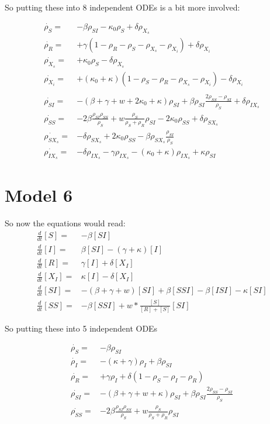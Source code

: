 \documentclass[a4paper,10pt]{article}
\begin{document}
 So putting these into 8 independent ODEs is a bit more involved:
 
 \begin{align}
  \dot{\rho_S}=&-\beta \rho_{SI}-\kappa_0\rho_S+ \delta \rho_{X_s}\\
  \dot{\rho_{R}}=&+
  \gamma(1-\rho_{R}-\rho_{S}-\rho_{X_s}-\rho_{X_i}) +\delta \rho_{X_i}\\
  \dot {\rho_{X_s}}=&+
  \kappa_0\rho_S - \delta \rho_{X_s}\\
  \dot {\rho_{X_i}}= &
  +(\kappa_0+\kappa)(1-\rho_{S}-\rho_{R}-\rho_{X_s}-\rho_{X_i}) - \delta \rho_{X_i}\\
  &\nonumber\\
  \dot{\rho_{SI}}=&
  -(\beta+\gamma+w+2\kappa_0+\kappa)\rho_{SI}+\beta\rho_{SI}\frac{2\rho_{SS}-\rho_{SI}}{\rho_S}+ \delta \rho_{IX_s}\\
  \dot{\rho_{SS}}=& - 2\beta\frac{\rho_{SI}\rho_{SS}}{\rho_{S}}+w\frac{\rho_S}{\rho_S+\rho_{R}}\rho_{SI} - 2\kappa_0\rho_{SS} + \delta\rho_{SX_{s}}\\
  \dot{\rho_{SX_{s}}}=&
  -\delta\rho_{SX_s}+2\kappa_0\rho_{SS}-\beta\rho_{SX_{s}}\frac{\rho_{SI}}{\rho_S}\\
  \dot{\rho_{IX_{s}}}=&
  -\delta\rho_{IX_{s}}-\gamma\rho_{IX_{s}}-(\kappa_0+\kappa)\rho_{IX_{s}}+\kappa\rho_{SI}
 \end{align}
 
 \section{Model 6}

So now the equations would read:
\begin{align}
 \frac{d}{dt} [S]
 =&
 -\beta [SI] 
 \\
 \frac{d}{dt} [I]
 =&
 \beta [SI] - (\gamma + \kappa)[I] 
 \\
 \frac{d}{dt} [R]
 =&
\gamma [I] +\delta[X_I]
 \\
 \frac{d}{dt} [X_I]
 =&
\kappa[I] - \delta[X_I]
 \\
 \frac{d}{dt} [SI]
 =&
 -(\beta+\gamma+w)[SI] + \beta[SSI] -\beta[ISI] - \kappa [SI]
 \\
 \frac{d}{dt} [SS]
 =&
- \beta [SSI] + w*\frac{[S]}{[R]+[S]} [SI]
 \end{align}
 
 So putting these into 5 independent ODEs 
 
 
  \begin{align}
  \dot{\rho_S}=&-\beta \rho_{SI}\\ 
  \dot {\rho_{I}}= &
  -(\kappa+\gamma)\rho_{I} +\beta\rho_{SI}\\
  \dot{\rho_{R}}=&+
  \gamma\rho_I +\delta (1-\rho_{S}-\rho_{I}-\rho_{R})\\
  \dot{\rho_{SI}}=&
  -(\beta+\gamma+w+\kappa)\rho_{SI}+\beta\rho_{SI}\frac{2\rho_{SS}-\rho_{SI}}{\rho_S}\\
  \dot{\rho_{SS}}=& - 2\beta\frac{\rho_{SI}\rho_{SS}}{\rho_{S}}+w\frac{\rho_S}{\rho_S+\rho_{R}}\rho_{SI}
 \end{align}
 
\end{document}
